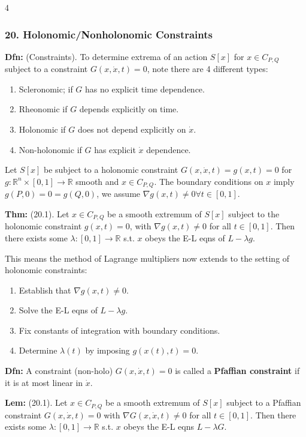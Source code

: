 \documentclass[landscape, 8pt]{extarticle}
\begin{document}
\begin{multicols*}{4}
		\subsubsection*{\tiny{20. Holonomic/Nonholonomic Constraints}}
		\vspace*{-5pt}
		
		\textbf{Dfn:} (Constraints). To determine extrema of an action $S[x]$ for $x\in C_{P,Q}$ subject to a constraint $G(x,\dot{x},t)=0$, note there are 4 different types:
		\begin{enumerate}[leftmargin=*,topsep=0pt,itemsep=0pt]
			\item Scleronomic; if $G$ has no explicit time dependence.
			\item Rheonomic if $G$ depends explicitly on time.
			\item Holonomic if $G$ does not depend explicitly on $\dot{x}$.
			\item Non-holonomic if $G$ has explicit $\dot{x}$ dependence.
		\end{enumerate}
		
		Let $S[x]$ be subject to a holonomic constraint $G(x,\dot{x},t)=g(x,t)=0$ for $g:\mathbb{R}^n\times[0,1]\to\mathbb{R}$ smooth and $x\in C_{P,Q}$. The boundary conditions on $x$ imply $g(P,0)=0=g(Q,0)$, we assume $\nabla g(x,t)\neq 0\forall t\in[0,1]$.
		
		
		\textbf{Thm:} (20.1). Let $x\in C_{P,Q}$ be a smooth extremum of $S[x]$ subject to the holonomic constraint $g(x,t)=0$, with $\nabla g(x,t)\neq 0$ for all $t\in[0,1]$. Then there exists some $\lambda:[0,1]\to\mathbb{R}$ s.t. $x$ obeys the E-L eqns of $L-\lambda g$.
		
		This means the method of Lagrange multipliers now extends to the setting of holonomic constraints:
		\begin{enumerate}[leftmargin=*,topsep=0pt,itemsep=0pt]
			\item Establish that $\nabla g(x,t)\neq 0$.
			\item Solve the E-L eqns of $L-\lambda g$.
			\item Fix constants of integration with boundary conditions.
			\item Determine $\lambda(t)$ by imposing $g(x(t),t)=0$.
		\end{enumerate}
		
		\textbf{Dfn:} A constraint (non-holo) $G(x,\dot{x},t)=0$ is called a \textbf{Pfaffian constraint} if it is at most linear in $\dot{x}$.
		
		\textbf{Lem:} (20.1). Let $x\in C_{P,Q}$ be a smooth extremum of $S[x]$ subject to a Pfaffian constraint $G(x,\dot{x},t)=0$ with $\nabla G(x,\dot{x},t)\neq 0$ for all $t\in[0,1]$. Then there exists some $\lambda:[0,1]\to\mathbb{R}$ s.t. $x$ obeys the E-L eqns $L-\lambda G$.
		
	\end{multicols*}
\end{document}
